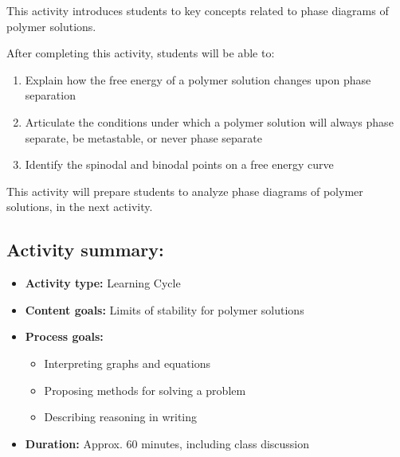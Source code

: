 %
%
%
%

\renewcommand{\figpath}{content/polymphys/solution-thermo/phase-sep/figs}
\newcommand{\labelbase}{phase-sep}

\begin{activity}

\begin{instructornotes}

	This activity introduces students to key concepts related to phase diagrams of polymer solutions.
	
	After completing this activity, students will be able to:
			\begin{enumerate}
				\item Explain how the free energy of a polymer solution changes upon phase separation
				\item Articulate the conditions under which a polymer solution will always phase separate, be metastable, or never phase separate
				\item Identify the spinodal and binodal points on a free energy curve
			\end{enumerate}
			
	This activity will prepare students to analyze phase diagrams of polymer solutions, in the next activity.
			
	\subsection*{Activity summary:}
	\begin{itemize}
		\item \textbf{Activity type:} Learning Cycle
		\item \textbf{Content goals:} Limits of stability for polymer solutions
		\item \textbf{Process goals:} %
			\begin{itemize}
				\item Interpreting graphs and equations
				\item Proposing methods for solving a problem
				\item Describing reasoning in writing
			\end{itemize}
		\item \textbf{Duration:} Approx. 60 minutes, including class discussion
		

\end{itemize}
\end{instructornotes}
\end{activity}

